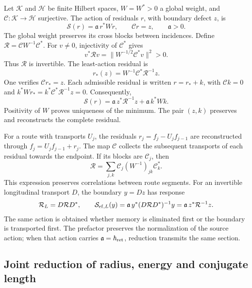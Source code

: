 Let \(\mathcal K\) and \(\mathcal H\) be finite Hilbert spaces, \(W=W^*>0\) a global weight, and \(\mathcal C:\mathcal K\to\mathcal H\) surjective. The action of residuals \(r\), with boundary defect \(z\), is
\[
 \mathcal S(r)=\mathfrak a\,r^*Wr,
 \qquad \mathcal Cr=z,\qquad \mathfrak a>0.
\]
The global weight preserves its cross blocks between incidences. Define \(\mathcal R=\mathcal CW^{-1}\mathcal C^*\). For \(v\ne0\), injectivity of \(\mathcal C^*\) gives
\[
 v^*\mathcal Rv=\|W^{-1/2}\mathcal C^*v\|^2>0.
\]
Thus \(\mathcal R\) is invertible. The least-action residual is
\[
 r_*(z)=W^{-1}\mathcal C^*\mathcal R^{-1}z.
\]
One verifies \(\mathcal Cr_*=z\). Each admissible residual is written \(r=r_*+k\), with \(\mathcal Ck=0\) and \(k^*Wr_*=k^*\mathcal C^*\mathcal R^{-1}z=0\). Consequently,
\begin{equation}
 \mathcal S(r)=\mathfrak a\,z^*\mathcal R^{-1}z
             +\mathfrak a\,k^*Wk.
 \label{g26:eq:accion-residuo-es}
\end{equation}
Positivity of \(W\) proves uniqueness of the minimum. The pair \((z,k)\) preserves and reconstructs the complete residual.

For a route with transports \(U_j\), the residuals \(r_j=f_j-U_jf_{j-1}\) are reconstructed through \(f_j=U_jf_{j-1}+r_j\). The map \(\mathcal C\) collects the subsequent transports of each residual towards the endpoint. If its blocks are \(\mathcal C_j\), then
\[
 \mathcal R=\sum_{j,k}\mathcal C_j(W^{-1})_{jk}\mathcal C_k^*.
\]
This expression preserves correlations between route segments. For an invertible longitudinal transport \(D\), the boundary \(y=Dz\) has response
\[
 \mathcal R_L=D\mathcal RD^*,\qquad
 \mathcal S_{{\rm ef},L}(y)
 =\mathfrak a\,y^*(D\mathcal RD^*)^{-1}y
 =\mathfrak a\,z^*\mathcal R^{-1}z.
\]
The same action is obtained whether memory is eliminated first or the boundary is transported first. The prefactor preserves the normalization of the source action; when that action carries \(\mathfrak a=\hbar_{\rm ret}\), reduction transmits the same section.

\subsection{Joint reduction of radius, energy and conjugate length}


